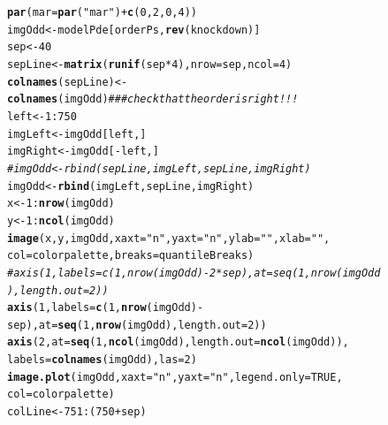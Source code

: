 \documentclass[a4paper]{article}
\makeatletter
\newcommand{\hlnum}[1]{\textcolor[rgb]{0.686,0.059,0.569}{#1}}%
\newcommand{\hlstr}[1]{\textcolor[rgb]{0.192,0.494,0.8}{#1}}%
\newcommand{\hlcom}[1]{\textcolor[rgb]{0.678,0.584,0.686}{\textit{#1}}}%
\newcommand{\hlopt}[1]{\textcolor[rgb]{0,0,0}{#1}}%
\newcommand{\hlstd}[1]{\textcolor[rgb]{0.345,0.345,0.345}{#1}}%
\newcommand{\hlkwb}[1]{\textcolor[rgb]{0.69,0.353,0.396}{#1}}%
\newcommand{\hlkwc}[1]{\textcolor[rgb]{0.333,0.667,0.333}{#1}}%
\newcommand{\hlkwd}[1]{\textcolor[rgb]{0.737,0.353,0.396}{\textbf{#1}}}%
\newenvironment{kframe}{%
 \def\at@end@of@kframe{}%
 \ifinner\ifhmode%
  \def\at@end@of@kframe{\end{minipage}}%
  \begin{minipage}{\columnwidth}%
 \fi\fi%
 \def\FrameCommand##1{\hskip\@totalleftmargin \hskip-\fboxsep
 \colorbox{shadecolor}{##1}\hskip-\fboxsep
     \hskip-\linewidth \hskip-\@totalleftmargin \hskip\columnwidth}%
 \MakeFramed {\advance\hsize-\width
   \@totalleftmargin\z@ \linewidth\hsize
   \@setminipage}}%
 {\par\unskip\endMakeFramed%
 \at@end@of@kframe}
\newenvironment{knitrout}{}{} %
\makeatother
\begin{document}
\begin{figure}[htbp]
\begin{center}
\begin{knitrout}
\color{fgcolor}\begin{kframe}
\begin{alltt}
\hlkwd{par}\hlstd{(} \hlkwc{mar} \hlstd{=} \hlkwd{par}\hlstd{(} \hlstr{"mar"} \hlstd{)} \hlopt{+} \hlkwd{c}\hlstd{(} \hlnum{0}\hlstd{,} \hlnum{2}\hlstd{,} \hlnum{0}\hlstd{,} \hlnum{4} \hlstd{) )}
\hlstd{imgOdd} \hlkwb{<-} \hlstd{modelPde[orderPs,}\hlkwd{rev}\hlstd{(knockdown)]}
\hlstd{sep} \hlkwb{<-} \hlnum{40}
\hlstd{sepLine} \hlkwb{<-} \hlkwd{matrix}\hlstd{(}\hlkwd{runif}\hlstd{(sep}\hlopt{*}\hlnum{4}\hlstd{),} \hlkwc{nrow}\hlstd{=sep,} \hlkwc{ncol}\hlstd{=}\hlnum{4}\hlstd{)}
\hlkwd{colnames}\hlstd{(sepLine)} \hlkwb{<-} \hlkwd{colnames}\hlstd{(imgOdd)} \hlcom{### check that the order is right!!!}
\hlstd{left} \hlkwb{<-} \hlnum{1}\hlopt{:}\hlnum{750}
\hlstd{imgLeft} \hlkwb{<-} \hlstd{imgOdd[left,]}
\hlstd{imgRight} \hlkwb{<-} \hlstd{imgOdd[}\hlopt{-}\hlstd{left,]}
\hlcom{# imgOdd <- rbind(sepLine, imgLeft, sepLine, imgRight)}
\hlstd{imgOdd} \hlkwb{<-} \hlkwd{rbind}\hlstd{(imgLeft, sepLine, imgRight)}
\hlstd{x} \hlkwb{<-} \hlnum{1}\hlopt{:}\hlkwd{nrow}\hlstd{(imgOdd)}
\hlstd{y} \hlkwb{<-} \hlnum{1}\hlopt{:}\hlkwd{ncol}\hlstd{(imgOdd)}
\hlkwd{image}\hlstd{(x,y,imgOdd,} \hlkwc{xaxt}\hlstd{=}\hlstr{"n"}\hlstd{,} \hlkwc{yaxt}\hlstd{=}\hlstr{"n"}\hlstd{,} \hlkwc{ylab}\hlstd{=}\hlstr{""}\hlstd{,} \hlkwc{xlab}\hlstd{=}\hlstr{""}\hlstd{,}
\hlkwc{col}\hlstd{=colorpalette,} \hlkwc{breaks}\hlstd{=quantileBreaks)}
\hlcom{# axis( 1, labels=c(1, nrow(imgOdd)-2*sep), at=seq(1,nrow(imgOdd),length.out=2))}
\hlkwd{axis}\hlstd{(} \hlnum{1}\hlstd{,} \hlkwc{labels}\hlstd{=}\hlkwd{c}\hlstd{(}\hlnum{1}\hlstd{,} \hlkwd{nrow}\hlstd{(imgOdd)}\hlopt{-}\hlstd{sep),} \hlkwc{at}\hlstd{=}\hlkwd{seq}\hlstd{(}\hlnum{1}\hlstd{,}\hlkwd{nrow}\hlstd{(imgOdd),}\hlkwc{length.out}\hlstd{=}\hlnum{2}\hlstd{))}
\hlkwd{axis}\hlstd{(} \hlnum{2}\hlstd{,} \hlkwc{at}\hlstd{=}\hlkwd{seq}\hlstd{(}\hlnum{1}\hlstd{,}\hlkwd{ncol}\hlstd{(imgOdd),}\hlkwc{length.out}\hlstd{=}\hlkwd{ncol}\hlstd{(imgOdd) ),}
\hlkwc{labels}\hlstd{=} \hlkwd{colnames}\hlstd{( imgOdd ),} \hlkwc{las}\hlstd{=} \hlnum{2} \hlstd{)}
\hlkwd{image.plot}\hlstd{(imgOdd,} \hlkwc{xaxt}\hlstd{=}\hlstr{"n"}\hlstd{,} \hlkwc{yaxt}\hlstd{=}\hlstr{"n"}\hlstd{,} \hlkwc{legend.only}\hlstd{=}\hlnum{TRUE}\hlstd{,}
\hlkwc{col}\hlstd{=colorpalette)}
\hlstd{colLine} \hlkwb{<-} \hlnum{751}\hlopt{:}\hlstd{(}\hlnum{750}\hlopt{+}\hlstd{sep)}

\end{alltt}
\end{kframe}
\end{knitrout}
\end{center}
\end{figure}
\end{document}
